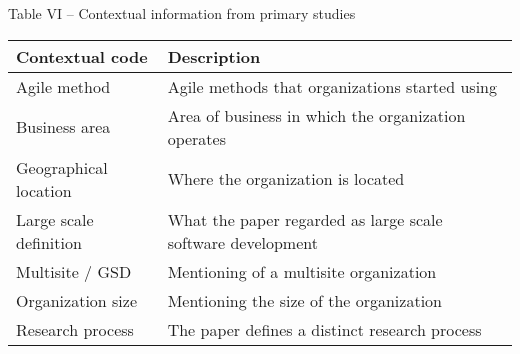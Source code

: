 \centering
Table VI – Contextual information from primary studies

\begin{center}
    \begin{tabular}{l l }
        \bfseries{Contextual code} & \bfseries{Description} \\
        \hline
        Agile method & Agile methods that organizations started using \\
        Business area & Area of business in which the organization operates \\
        Geographical location & Where the organization is located \\
        Large scale definition & What the paper regarded as large scale software development \\
        Multisite / GSD & Mentioning of a multisite organization \\
        Organization size & Mentioning the size of the organization \\
        Research process & The paper defines a distinct research process \\
        \hline
    \end{tabular}
\end{center}
\justify
